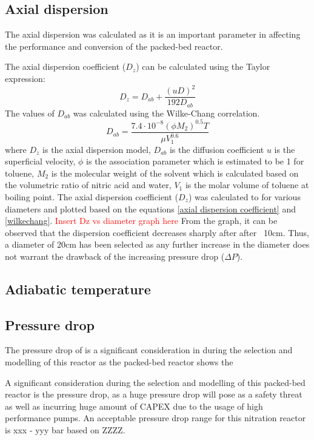\subsection{Axial dispersion}
The axial dispersion was calculated as it is an important parameter in affecting the performance and conversion of the packed-bed reactor. 

The axial dispersion coefficient ($D_z$) can be calculated using the Taylor expression: 
\begin{equation}
    D_z=D_{ab}+\frac{(uD)^2}{192D_{ab}}
    \label{axial dispersion coefficient}
\end{equation}
The values of $D_{ab}$ was calculated using the Wilke-Chang correlation.
\begin{equation}
    D_{ab}=\frac{7.4\cdot 10^{-8}(\phi M_2)^{0.5}T}{\mu V_1^{0.6}}
    \label{wilkechang}
\end{equation}
where $D_z$ is the axial dispersion model, $D_{ab}$ is the diffusion coefficient $u$ is the superficial velocity, $\phi$ is the association parameter which is estimated to be 1 for toluene, $M_2$ is the molecular weight of the solvent which is calculated based on the volumetric ratio of nitric acid and water, $V_1$ is the molar volume of toluene at boiling point.
The axial dispersion coefficient ($D_z$) was calculated to for various diameters and plotted based on the equations \ref{axial dispersion coefficient} and \ref{wilkechang}.
\textcolor{red}{Insert Dz vs diameter graph here} 
From the graph, it can be observed that the dispersion coefficient decreases sharply after after ~10cm. Thus, a diameter of 20cm has been selected as any further increase in the diameter does not warrant the drawback of the increasing pressure drop ($\Delta P$).
\subsection{Adiabatic temperature}
\subsection{Pressure drop}
The pressure drop of is a significant consideration in during the selection and modelling of this reactor as the packed-bed reactor shows the 

A significant consideration during the selection and modelling of this packed-bed reactor is the pressure drop, as a huge pressure drop will pose as a safety threat as well as incurring huge amount of CAPEX due to the usage of high performance pumps. An acceptable pressure drop range for this nitration reactor is xxx - yyy bar based on ZZZZ. 

